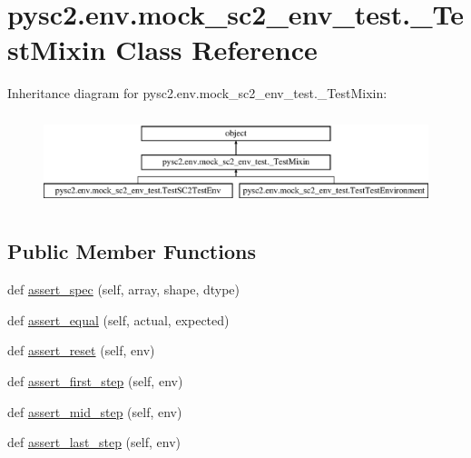 \hypertarget{classpysc2_1_1env_1_1mock__sc2__env__test_1_1___test_mixin}{}\section{pysc2.\+env.\+mock\+\_\+sc2\+\_\+env\+\_\+test.\+\_\+\+Test\+Mixin Class Reference}
\label{classpysc2_1_1env_1_1mock__sc2__env__test_1_1___test_mixin}
Inheritance diagram for pysc2.\+env.\+mock\+\_\+sc2\+\_\+env\+\_\+test.\+\_\+\+Test\+Mixin\+:\begin{figure}[H]
\begin{center}
\leavevmode
\includegraphics[height=2.683706cm]{classpysc2_1_1env_1_1mock__sc2__env__test_1_1___test_mixin}
\end{center}
\end{figure}
\subsection*{Public Member Functions}
\begin{DoxyCompactItemize}
\item 
def \mbox{\hyperlink{classpysc2_1_1env_1_1mock__sc2__env__test_1_1___test_mixin_ae44862283422b3f9f4cff0364e7718fe}{assert\+\_\+spec}} (self, array, shape, dtype)
\item 
def \mbox{\hyperlink{classpysc2_1_1env_1_1mock__sc2__env__test_1_1___test_mixin_adadfb2c15fcb2d44285adfe0abdda38b}{assert\+\_\+equal}} (self, actual, expected)
\item 
def \mbox{\hyperlink{classpysc2_1_1env_1_1mock__sc2__env__test_1_1___test_mixin_ae9e82d6e4019a1f2c3101bebbb570988}{assert\+\_\+reset}} (self, env)
\item 
def \mbox{\hyperlink{classpysc2_1_1env_1_1mock__sc2__env__test_1_1___test_mixin_a4c77f1899a786872425080daa843b2c4}{assert\+\_\+first\+\_\+step}} (self, env)
\item 
def \mbox{\hyperlink{classpysc2_1_1env_1_1mock__sc2__env__test_1_1___test_mixin_ae0bece3faa1dfe55f8a9057fe33e6522}{assert\+\_\+mid\+\_\+step}} (self, env)
\item 
def \mbox{\hyperlink{classpysc2_1_1env_1_1mock__sc2__env__test_1_1___test_mixin_a52dcd33d92eb8498d7986def1cb48626}{assert\+\_\+last\+\_\+step}} (self, env)
\end{DoxyCompactItemize}


